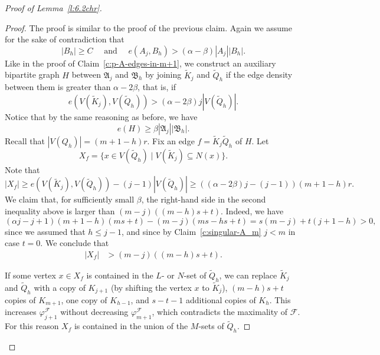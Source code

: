 \documentclass[reqno, 12pt]{amsart}
\numberwithin{equation}{section}
\numberwithin{figure}{section}
\theoremstyle{plain}
\theoremstyle{definition}
\let\phi=\varphi
\def\cF{{\mathcal F}}
\def\fA{\mathfrak{A}}
\def\fB{\mathfrak{B}}
\begin{document}
\begin{proof}[Proof of Lemma~\ref{l:6.2chr}]
        \begin{proof}
            The proof is similar to the proof of the previous claim. Again we assume for the sake of contradiction that 
            \begin{equation}\label{eq:B_h}
                |B_h|\geq C \quad \text{ and } \quad e(A_j,B_h)> (\alpha-\beta)|A_j||B_h|.
            \end{equation}
            Like in the proof of Claim~\ref{c:p-A-edges-in-m+1}, we construct an auxiliary bipartite graph $H$ between $\fA_j$ and $\fB_h$ by joining $\tilde K_j$ and $\tilde Q_h$ if the edge density between them is greater than $\alpha-2\beta$, that is, if 
            \[e(V(\tilde K_j), V(\tilde Q_h))> (\alpha-2\beta)j|V(\tilde Q_h)|.\]
            Notice that by the same reasoning as before, we have
            \[ e(H) \geq \beta|\fA_j||\fB_h|.\]
            Recall that $|V(Q_h)| = (m+1-h)r$. Fix an edge $f=\tilde K_j \tilde Q_h$ of $H$. 
            Let 
            \[
            X_f=\{x\in V(\tilde Q_h)\mid V(\tilde K_j) \subseteq N(x)\}.
            \]
            Note that 
            \[|X_f|  \geq e(V(\tilde K_j), V(\tilde Q_h))-(j-1)|V(\tilde Q_h)|\geq ((\alpha-2\beta)j-(j-1))(m+1-h)r.\] 
            We claim that, for sufficiently small $\beta$, the right-hand side in the second inequality above is larger than $(m-j)((m-h)s+t).$ Indeed, we have
            $$(\alpha j -j+1)(m+1-h)(ms+t)-(m-j)(ms-hs+t)= s(m-j)+t(j+1-h)>0,$$
            since we assumed that $h \leq j-1$, and since by Claim~\ref{c:singular-A_m} $j<m$ in case $t=0$.
            We conclude that
            \begin{equation}
             \label{eq:size-Xf}
            \begin{split}
            |X_f| %
            & > (m-j)((m-h)s+t).
            \end{split}
            \end{equation}

            If some vertex $x\in X_f$ is contained in the $L$- or $N$-set of $\tilde Q_h$, we can replace $\tilde K_j$ and $\tilde Q_h$ with a copy of $K_{j+1}$ (by shifting the vertex $x$ to $\tilde K_j$), $(m-h)s+t$ copies of $K_{m+1}$, one copy of $K_{h-1}$, and $s-t-1$ additional copies of $K_h$. This increases $\phi_{j+1}^\cF$ without decreasing $\phi_{m+1}^\cF$, which contradicts the maximality of $\cF$. For this reason $X_f$ is contained in the union of the $M$-sets of $\tilde Q_h$. 
            

\end{proof}
\end{proof}
\end{document}
